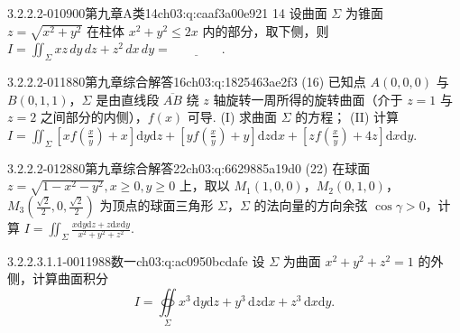 \begin{q}{3.2.2.2-010}{900第九章A类14}{ch03:q:caaf3a00e921}
14 设曲面 $\Sigma$ 为锥面 $z=\sqrt{x^2+y^2}$ 在柱体 $x^2+y^2\le 2x$ 内的部分，取下侧，则 $\displaystyle I=\iint_{\Sigma} xz\,dy\,dz+z^2\,dx\,dy=\underline{\hspace{4em}}.$
\end{q}

\begin{q}{3.2.2.2-011}{880第九章综合解答16}{ch03:q:1825463ae2f3}
(16) 已知点 $A(0,0,0)$ 与 $B(0,1,1)$，$\Sigma$ 是由直线段 $\overline{AB}$ 绕 $z$ 轴旋转一周所得的旋转曲面（介于 $z=1$ 与 $z=2$ 之间部分的内侧），$f(x)$ 可导.
(I) 求曲面 $\Sigma$ 的方程；
(II) 计算 $\displaystyle I=\iint_{\Sigma}\left[x f\left(\frac{x}{y}\right)+x\right]\mathrm{d}y\mathrm{d}z+\left[y f\left(\frac{x}{y}\right)+y\right]\mathrm{d}z\mathrm{d}x+\left[z f\left(\frac{x}{y}\right)+4z\right]\mathrm{d}x\mathrm{d}y.$
\end{q}

\begin{q}{3.2.2.2-012}{880第九章综合解答22}{ch03:q:6629885a19d0}
(22) 在球面 $z=\sqrt{1-x^2-y^2},x\geqslant 0,y\geqslant 0$ 上，取以 $M_1(1,0,0)$，$M_2(0,1,0)$，$M_3\left(\frac{\sqrt{2}}{2},0,\frac{\sqrt{2}}{2}\right)$ 为顶点的球面三角形 $\Sigma$，$\Sigma$ 的法向量的方向余弦 $\cos\gamma>0$，计算 $\displaystyle I=\iint_{\Sigma}\frac{x\mathrm{d}y\mathrm{d}z+z\mathrm{d}x\mathrm{d}y}{x^2+y^2+z^2}$.
\end{q}

\par\addvspace{2.4ex}\noindent
\begin{minipage}{\linewidth}



\begin{q}{3.2.2.3.1.1-001}{1988数一}{ch03:q:ac0950bcdafe}
设 $\Sigma$ 为曲面 $x^2+y^2+z^2=1$ 的外侧，计算曲面积分
\[I=\mathop{{\oiint}}\limits_{\Sigma} x^3\,\mathrm{d}y\mathrm{d}z+y^3\,\mathrm{d}z\mathrm{d}x+z^3\,\mathrm{d}x\mathrm{d}y.\]
\end{q}
\end{minipage}


